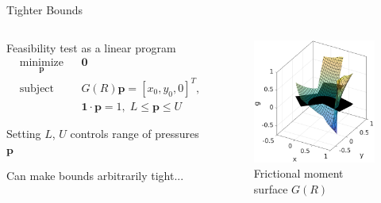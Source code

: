 \documentclass[10pt]{beamer}
\begin{document}
\begin{frame}{Tighter Bounds}
  \begin{columns}[T,onlytextwidth]
    \begin{list}{}{
        \setlength{\leftmargin}{0pt}
        \setlength{\labelwidth}{0pt}
      }
    \item Feasibility test as a linear program
      \begin{equation*}
        \begin{aligned}
          & \underset{\mathbf{p}}{\text{minimize}}
          & & \mathbf{0} \\
          & \text{subject to}
          & & G(R)\mathbf{p} = [x_0,y_0,0]^T,\\%
          & & & \mathbf{1}\cdot\mathbf{p} = 1,\; L \leq \mathbf{p} \leq U
        \end{aligned} \label{eq:lin-prog-PiCH}
      \end{equation*}\vspace{5mm}
    \item Setting $L$, $U$ controls range of pressures
      $\mathbf{p}$
    \item Can make bounds arbitrarily tight...
    \end{list}
    \begin{figure}[t]
      \centering
      \includegraphics[width=0.7\linewidth]{fig/moment_hull_2}
      \caption{Frictional moment surface $G(R)$}
    \end{figure}
  \end{columns}
\end{frame}
\end{document}
